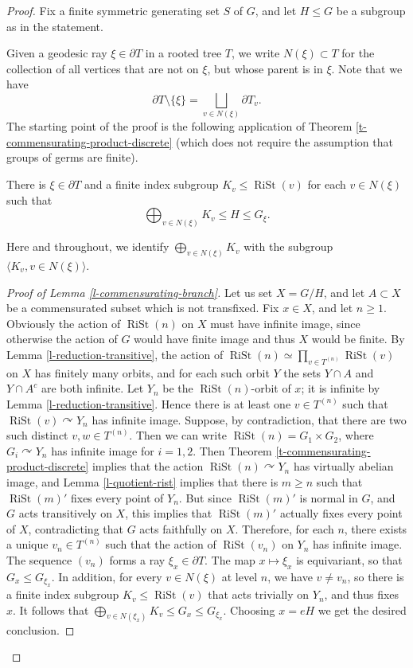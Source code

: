 \documentclass[10pt,a4paper]{amsart}
\newcommand{\acts}{\ensuremath{\curvearrowright}}%
\newcommand{\rist}{\ensuremath{\operatorname{RiSt}}}%
\begin{document}
\begin{proof}
Fix a finite symmetric generating set $S$ of $G$, and let  $H\le G$ be a subgroup as in the statement. 


Given a geodesic ray $\xi\in \partial T$ in a rooted tree $T$, we write $N(\xi)\subset T$ for the collection of all vertices that are not on $\xi$, but whose parent is in $\xi$.   Note that we have	\[\partial T\setminus \{\xi\}=\bigsqcup_{v\in N(\xi)} \partial T_v.\] 
The starting point of the proof is the following application of Theorem \ref{t-commensurating-product-discrete} (which does not require the assumption that groups of germs are finite).

\begin{lemma} \label{l-commensurating-branch}
There is $\xi\in \partial T$ and a finite index subgroup $K_v \le \rist(v)$ for each  $v\in  N(\xi)$ such that 
	\begin{equation}\label{e-subgroup} \bigoplus_{v\in N(\xi)} K_v \le H \le G_{\xi}.\end{equation}\end{lemma}
Here and throughout, we identify $\bigoplus_{v\in N(\xi)} K_v$ with the subgroup $\langle K_v, v\in N(\xi)\rangle$.
\begin{proof}[Proof of Lemma \ref{l-commensurating-branch}]
Let us set $X=G/H$, and let $A\subset X$ be a commensurated subset which is not transfixed. Fix $x\in X$, and let $n\ge 1$. Obviously the action of $\rist(n)$ on $X$ must have infinite image, since otherwise the action of $G$ would have finite image and thus $X$ would be finite. By Lemma \ref{l-reduction-transitive}, the action of $\rist(n)\simeq \prod_{v\in T^{(n)}}\rist(v)$ on $X$ has finitely many orbits, and for each such orbit $Y$ the sets $Y\cap A$ and $Y\cap A^c$ are both infinite.  Let $Y_n$ be the $\rist(n)$-orbit of $x$; it is infinite by Lemma \ref{l-reduction-transitive}. Hence there is at least one $v\in T^{(n)}$ such that $\rist(v)\acts Y_n$ has infinite image. Suppose, by contradiction, that there are two such distinct $v, w\in T^{(n)}$. Then we can write $\rist(n)=G_1\times G_2$, where $G_i\acts Y_n$ has infinite image for $i=1, 2$. Then  Theorem \ref{t-commensurating-product-discrete} implies that the action $\rist(n)\acts Y_n$ has virtually abelian image, and Lemma \ref{l-quotient-rist} implies that there is $m\ge n$ such that $\rist(m)'$ fixes every point of $Y_n$. But since $\rist(m)'$ is normal in $G$, and $G$ acts transitively on $X$, this implies that $\rist(m)'$ actually fixes every point of $X$, contradicting that $G$ acts faithfully on $X$.  Therefore, for each $n$, there exists a unique $v_n\in T^{(n)}$ such that the action of $\rist(v_n)$ on $Y_n$ has infinite image. The sequence $(v_n)$ forms a ray $\xi_x\in \partial T$. The map $x\mapsto \xi_x$ is equivariant, so that $G_x\le G_{\xi_x}$. In addition, for every $v\in N(\xi)$ at level $n$, we have $v\neq v_n$, so there is a finite index subgroup $K_v\le \rist(v)$ that acts trivially on $Y_{n}$, and thus fixes $x$. It follows that $\bigoplus_{v\in N(\xi_x)} K_v\le G_x\le G_{\xi_x}$. Choosing $x=eH$ we get the desired conclusion. \qedhere
\end{proof}




\end{proof}
\end{document}
